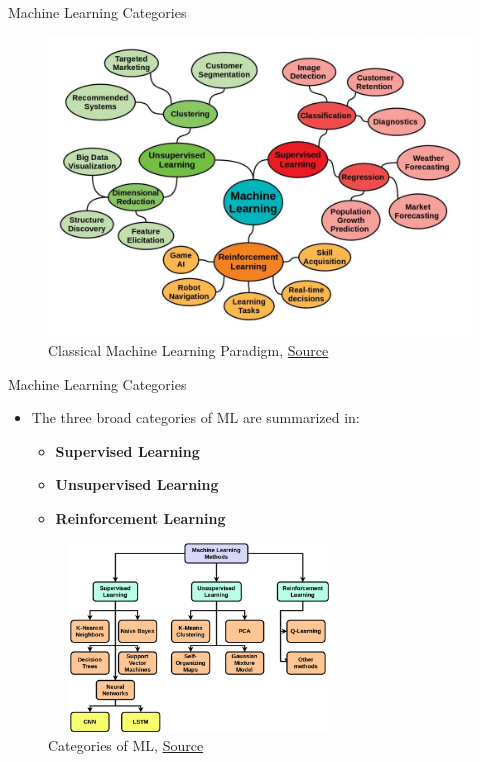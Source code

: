 \documentclass[compress,oilve]{beamer}
\begin{document}
\begin{frame}{Machine Learning Categories}

\begin{figure}
	\centering
	\includegraphics[scale=0.35]{Figs/1.jpeg}
	\caption{Classical Machine Learning Paradigm, \href{https://tinyurl.com/2zldw3my}{Source}}
\end{figure}
\end{frame}


\begin{frame}{Machine Learning Categories}
	\begin{itemize}
	\item The three broad categories of ML are summarized in:
		\begin{itemize}
		\item \textbf{Supervised Learning}
		\item \textbf{Unsupervised Learning}  
		\item \textbf{Reinforcement Learning} 
		\end{itemize}
	\end{itemize}
	\begin{figure}
		\includegraphics[width=8cm, height=5cm]{Figs/2-1.png}
		\caption{Categories of ML, \href{https://tinyurl.com/2qkt8vza}{Source}}
	\end{figure}
\end{frame}
\end{document}
